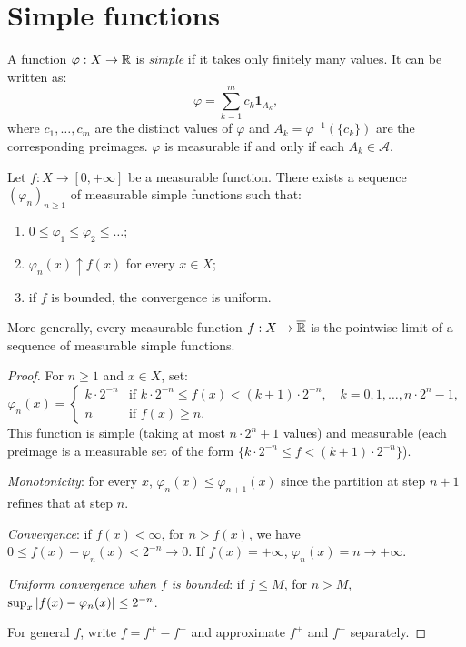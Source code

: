 \section{Simple functions}

\begin{definition}
A function $\varphi : X \to \mathbb{R}$ is \emph{simple} if it takes only finitely many
values. It can be written as:
\[
\varphi = \sum_{k=1}^m c_k \mathbf{1}_{A_k},
\]
where $c_1, \ldots, c_m$ are the distinct values of $\varphi$ and
$A_k = \varphi^{-1}(\{c_k\})$ are the corresponding preimages. $\varphi$ is
measurable if and only if each $A_k \in \mathcal{A}$.
\end{definition}

\begin{theorem}
\label{thm:simple_approximation}
Let $f : X \to [0, +\infty]$ be a measurable function. There exists a sequence
$(\varphi_n)_{n \geq 1}$ of measurable simple functions such that:
\begin{enumerate}
    \item $0 \leq \varphi_1 \leq \varphi_2 \leq \ldots$;
    \item $\varphi_n(x) \uparrow f(x)$ for every $x \in X$;
    \item if $f$ is bounded, the convergence is uniform.
\end{enumerate}
More generally, every measurable function $f : X \to \overline{\mathbb{R}}$ is the pointwise
limit of a sequence of measurable simple functions.
\end{theorem}

\begin{proof}
For $n \geq 1$ and $x \in X$, set:
\[
\varphi_n(x) = \begin{cases}
k \cdot 2^{-n} & \text{if } k \cdot 2^{-n} \leq f(x) < (k+1) \cdot 2^{-n},
\quad k = 0, 1, \ldots, n \cdot 2^n - 1, \\
n & \text{if } f(x) \geq n.
\end{cases}
\]
This function is simple (taking at most $n \cdot 2^n + 1$ values) and measurable
(each preimage is a measurable set of the form $\{k \cdot 2^{-n} \leq f <
(k+1) \cdot 2^{-n}\}$).

\emph{Monotonicity}: for every $x$, $\varphi_n(x) \leq \varphi_{n+1}(x)$ since the
partition at step $n+1$ refines that at step $n$.

\emph{Convergence}: if $f(x) < \infty$, for $n > f(x)$, we have
$0 \leq f(x) - \varphi_n(x) < 2^{-n} \to 0$. If $f(x) = +\infty$,
$\varphi_n(x) = n \to +\infty$.

\emph{Uniform convergence when $f$ is bounded}: if $f \leq M$, for $n > M$,
$\sup_x \left| f(x) - \varphi_n(x) \right| \leq 2^{-n}$.

For general $f$, write $f = f^+ - f^-$ and approximate $f^+$ and $f^-$ separately.
\end{proof}


